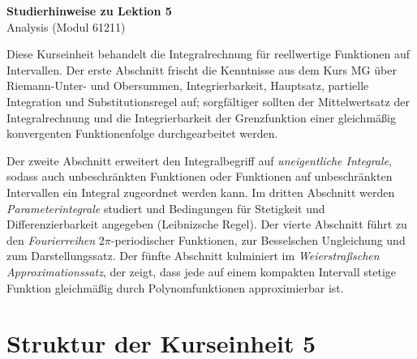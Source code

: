 \documentclass[a4paper,12pt]{article}
\begin{document}
\begin{center}
  {\LARGE\bfseries Studierhinweise zu Lektion 5}\\[0.5em]
  {\large Analysis (Modul 61211)}
\end{center}

\vspace{1em}

Diese Kurseinheit behandelt die Integralrechnung für reellwertige Funktionen auf
Intervallen. Der erste Abschnitt frischt die Kenntnisse aus dem Kurs MG über
Riemann-Unter- und Obersummen, Integrierbarkeit, Hauptsatz, partielle Integration
und Substitutionsregel auf; sorgfältiger sollten der Mittelwertsatz der
Integralrechnung und die Integrierbarkeit der Grenzfunktion einer gleichmäßig
konvergenten Funktionenfolge durchgearbeitet werden.

Der zweite Abschnitt erweitert den Integralbegriff auf \emph{uneigentliche
Integrale}, sodass auch unbeschränkten Funktionen oder Funktionen auf
unbeschränkten Intervallen ein Integral zugeordnet werden kann. Im dritten
Abschnitt werden \emph{Parameterintegrale} studiert und Bedingungen für
Stetigkeit und Differenzierbarkeit angegeben (Leibnizsche Regel). Der vierte
Abschnitt führt zu den \emph{Fourierreihen} $2\pi$-periodischer Funktionen, zur
Besselschen Ungleichung und zum Darstellungssatz. Der fünfte Abschnitt
kulminiert im \emph{Weierstraßschen Approximationssatz}, der zeigt, dass jede
auf einem kompakten Intervall stetige Funktion gleichmäßig durch
Polynomfunktionen approximierbar ist.

\section*{Struktur der Kurseinheit 5}
\end{document}
